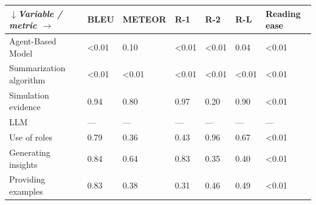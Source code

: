 \begin{tabular}{|l|l|l|l|l|l|l|}
\hline
\textit{$\downarrow$Variable / metric $\rightarrow$} & BLEU & METEOR & R-1 & R-2 & R-L & Reading ease \\
 \hline
 Agent-Based Model & \textless{}0.01 & 0.10 & \textless{}0.01 & \textless{}0.01 & 0.04 & \textless{}0.01 \\
 \hline
 Summarization algorithm & \textless{}0.01 & \textless{}0.01 & \textless{}0.01 & \textless{}0.01 & \textless{}0.01 & \textless{}0.01 \\
 \hline
 Simulation evidence & 0.94 & 0.80 & 0.97 & 0.20 & 0.90 & \textless{}0.01 \\
 \hline
 LLM & — & — & — & — & — & — \\
 \hline
 Use of roles & 0.79 & 0.36 & 0.43 & 0.96 & 0.67 & \textless{}0.01 \\
 \hline
 Generating insights & 0.84 & 0.64 & 0.83 & 0.35 & 0.40 & \textless{}0.01 \\
 \hline
 Providing examples & 0.83 & 0.38 & 0.31 & 0.46 & 0.49 & \textless{}0.01 \\
\hline
\end{tabular}
